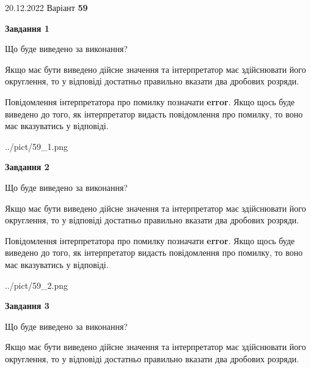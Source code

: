 \documentclass[12pt, ukrainian]{article}
\begin{document}
{20.12.2022 Варіант \No \textbf { 59 }\par}
{
\begin {Large}

{\begin {center}\textbf{Завдання 1}\end {center}}\par
Що буде виведено за виконання? \par

Якщо має бути виведено дійсне значення та інтерпретатор має здійснювати його округлення, 
то у відповіді достатньо правильно вказати два дробових розряди.

Повідомлення інтерпретатора про помилку позначати \textbf{error}.
Якщо щось буде виведено до того, як інтерпретатор видасть повідомлення про помилку, 
то воно має вказуватись у відповіді. \par

\begin{center}
	{../pict/59_1.png}
\end{center}
\newpage

{\begin {center}\textbf{Завдання 2}\end {center}}\par
Що буде виведено за виконання? \par

Якщо має бути виведено дійсне значення та інтерпретатор має здійснювати його округлення, 
то у відповіді достатньо правильно вказати два дробових розряди.

Повідомлення інтерпретатора про помилку позначати \textbf{error}.
Якщо щось буде виведено до того, як інтерпретатор видасть повідомлення про помилку, 
то воно має вказуватись у відповіді. \par

\begin{center}
	{../pict/59_2.png}
\end{center}
\newpage

{\begin {center}\textbf{Завдання 3}\end {center}}\par
Що буде виведено за виконання? \par

Якщо має бути виведено дійсне значення та інтерпретатор має здійснювати його округлення, 
то у відповіді достатньо правильно вказати два дробових розряди.


\end{Large}}
\end{document}
